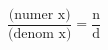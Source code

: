 \documentclass[12pt]{article}
\begin{document}
\sicpsize
\[
\frac{\text{(numer x)}}{\text{(denom x)}} = \frac{\text{n}}{\text{d}}
\]
\end{document}

